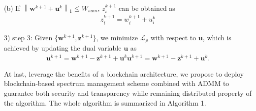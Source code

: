 \documentclass[journal]{IEEEtran}
\begin{document}
\begin{IEEEkeywords}
(b) If $\left\|\mathbf{w}^{k+1} + \mathbf{u}^k \right\|_1 \leq W_{sum}$, $z_i^{k+1}$ can be obtained as
\begin{align}
z_i^{k+1} = w_i^{k+1} + u_i^k
\end{align}

3) step 3: Given $\{\mathbf{w}^{k+1}, \mathbf{z}^{k+1}\}$, we minimize $\mathcal{L}_\rho$ with respect to $\mathbf{u}$, which is achieved
by updating the dual variable $\mathbf{u}$ as
\begin{align} \label{q24}
\mathbf{u}^{k+1} =\mathbf{w}^{k+1} - \mathbf{z}^{k+1} + \mathbf{u}^k
\mathbf{u}^{k+1} =\mathbf{w}^{k+1} - \mathbf{z}^{k+1} + \mathbf{u}^k.
\end{align}

At last, leverage the benefits
of a blockchain architecture, we propose to deploy blockchain-based spectrum management scheme combined with ADMM to guarantee both security and transparency while remaining distributed property of the algorithm. The whole algorithm is summarized in Algorithm 1.



\end{IEEEkeywords}
\end{document}
